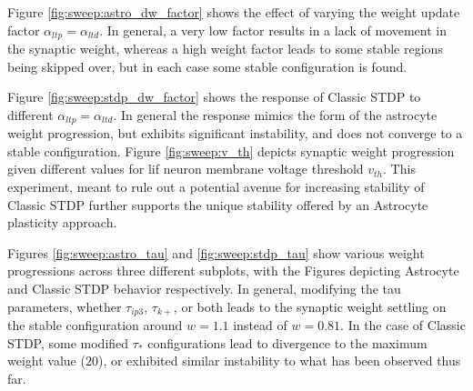 Figure \ref{fig:sweep:astro_dw_factor} shows the effect of varying the weight
update factor $\alpha_{ltp}=\alpha_{ltd}$. In general, a very low factor results
in a lack of movement in the synaptic weight, whereas a high weight factor leads
to some stable regions being skipped over, but in each case some stable
configuration is found.



Figure \ref{fig:sweep:stdp_dw_factor} shows the response of Classic STDP to
different $\alpha_{ltp}=\alpha_{ltd}$. In general the response mimics the form
of the astrocyte weight progression, but exhibits significant instability, and
does not converge to a stable configuration. Figure \ref{fig:sweep:v_th} depicts
synaptic weight progression given different values for \Gls{lif} neuron membrane
voltage threshold $v_{th}$. This experiment, meant to rule out a potential
avenue for increasing stability of Classic STDP further supports the unique
stability offered by an Astrocyte plasticity approach.


Figures \ref{fig:sweep:astro_tau} and \ref{fig:sweep:stdp_tau} show various
weight progressions across three different subplots, with the Figures
depicting Astrocyte and Classic STDP behavior respectively. In general,
modifying the tau parameters, whether $\tau_{ip3}$, $\tau_{k+}$, or both leads
to the synaptic weight settling on the stable configuration around $w=1.1$
instead of $w=0.81$. In the case of Classic STDP, some modified $\tau_*$
configurations lead to divergence to the maximum weight value ($20$), or
exhibited similar instability to what has been observed thus far.



